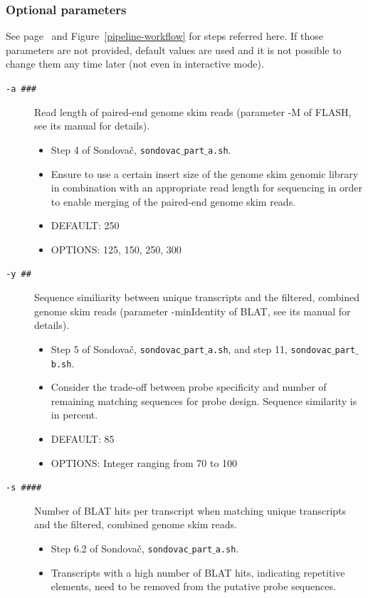 \documentclass[a4paper, 11pt, twoside]{article}
\begin{document}
\subsubsection{Optional parameters}

See page~\pageref{pipeline-overview} and Figure~\ref{pipeline-workflow} for steps referred here. If those parameters are not provided, default values are used and it is not possible to change them any time later (not even in interactive mode).

\begin{description}
\item[\texttt{-a \#\#\#}] Read length of paired-end genome skim reads (parameter -M of FLASH, see its manual for details).
  \begin{itemize}
    \item Step 4 of Sondovač, \texttt{sondovac$\_$part$\_$a.sh}.
    \item Ensure to use a certain insert size of the genome skim genomic library in combination with an appropriate read length for sequencing in order to enable merging of the paired-end genome skim reads.
    \item DEFAULT: 250
    \item OPTIONS: 125, 150, 250, 300
  \end{itemize}
\item[\texttt{-y \#\#}] Sequence similiarity between unique transcripts and the filtered, combined genome skim reads (parameter -minIdentity of BLAT, see its manual for details).
  \begin{itemize}
    \item Step 5 of Sondovač, \texttt{sondovac$\_$part$\_$a.sh}, and step 11, \texttt{sondovac$\_$part$\_$b.sh}.
    \item Consider the trade-off between probe specificity and number of remaining matching sequences for probe design. Sequence similarity is in percent.
    \item DEFAULT: 85
    \item OPTIONS: Integer ranging from 70 to 100
  \end{itemize}
\item[\texttt{-s \#\#\#\#}] Number of BLAT hits per transcript when matching unique transcripts and the filtered, combined genome skim reads.
  \begin{itemize}
    \item Step 6.2 of Sondovač, \texttt{sondovac$\_$part$\_$a.sh}.
    \item Transcripts with a high number of BLAT hits, indicating repetitive elements, need to be removed from the putative probe sequences.

\end{itemize}
\end{description}
\end{document}
